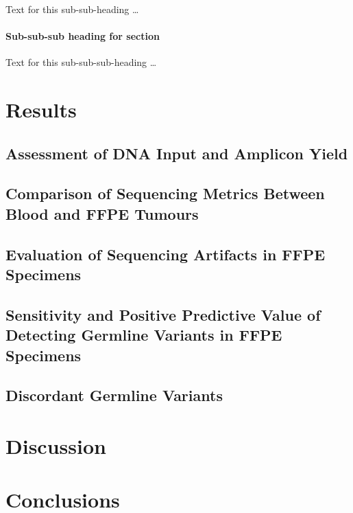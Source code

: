 \documentclass{bmcart}
\begin{document}
\subsubsection*{}
Text for this sub-sub-heading \ldots

\paragraph*{Sub-sub-sub heading for section}
Text for this sub-sub-sub-heading \ldots

\section*{Results}

\subsection*{Assessment of DNA Input and Amplicon Yield}

\subsection*{Comparison of Sequencing Metrics Between Blood and FFPE Tumours}

\subsection*{Evaluation of Sequencing Artifacts in FFPE Specimens}

\subsection*{Sensitivity and Positive Predictive Value of Detecting Germline Variants in FFPE Specimens}

\subsection*{Discordant Germline Variants}




\section*{Discussion}

\section*{Conclusions}
\end{document}
